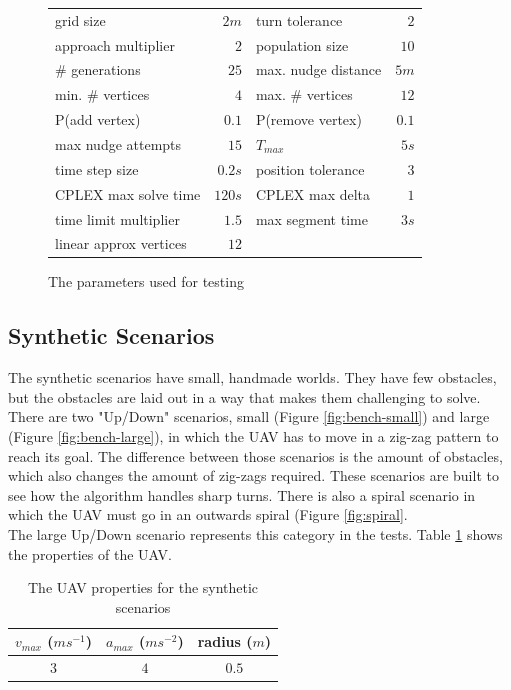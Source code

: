 \begin{figure}[h]
\centering
\begin{tabular}{ l  r | l r }
grid size 			& $2m$ 	& turn tolerance 		& $2$ \\
approach multiplier & $2$ 	& population size 		& $ 10$ \\
\# generations 		& $25$ 	& max. nudge distance 	& $5m$\\
min. \# vertices 	& $ 4$ 	& max. \# vertices 		& $12$ \\
P(add vertex) 		& $0.1$ & P(remove vertex) 		& $0.1$  \\
max nudge attempts 	& $15$ 	& $ T_{max}$ 			& $5s$ \\
time step size 		& $0.2s$& position tolerance & $3$ \\
CPLEX max solve time & $120s$ & CPLEX max delta & $1$ \\
time limit multiplier & $1.5$ & max segment time & $3s$\\
linear approx vertices & $12$ & & \\
\end{tabular}
\caption{The parameters used for testing}
\label{table:params}
\end{figure}
\clearpage
\subsection{Synthetic Scenarios}
\label{subsec:synth}
The synthetic scenarios have small, handmade worlds. They have few obstacles, but the obstacles are laid out in a way that makes them challenging to solve. There are two "Up/Down" scenarios, small (Figure \ref{fig:bench-small}) and large (Figure \ref{fig:bench-large}), in which the UAV has to move in a zig-zag pattern to reach its goal. The difference between those scenarios is the amount of obstacles, which also changes the amount of zig-zags required. These scenarios are built to see how the algorithm handles sharp turns. There is also a spiral scenario in which the UAV must go in an outwards spiral (Figure \ref{fig:spiral}.\\
The large Up/Down scenario represents this category in the tests. Table \ref{table:uav-synth} shows the properties of the UAV.

\begin{table}[h]
\centering
\begin{tabular}{ c | c | c }
$v_{max}$ ($ms^{-1}$)	& $a_{max}$ ($ms^{-2}$) 	& radius ($m$) 	 \\
\hline
$3$ & $4$ 	& $0.5$ \\
\end{tabular}
\caption{The UAV properties for the synthetic scenarios}
\label{table:uav-synth}
\end{table}

